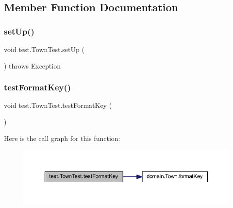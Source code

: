 \subsection{Member Function Documentation}
\mbox{\label{classtest_1_1_town_test_a9818b619a3ef6d7d7c03f19d48456eaf}} 
\subsubsection{\texorpdfstring{set\+Up()}{setUp()}}
{\footnotesize\ttfamily void test.\+Town\+Test.\+set\+Up (\begin{DoxyParamCaption}{ }\end{DoxyParamCaption}) throws Exception}

\mbox{\label{classtest_1_1_town_test_aafaac696506ffac04363befb43bf7b23}} 
\subsubsection{\texorpdfstring{test\+Format\+Key()}{testFormatKey()}}
{\footnotesize\ttfamily void test.\+Town\+Test.\+test\+Format\+Key (\begin{DoxyParamCaption}{ }\end{DoxyParamCaption})}

Here is the call graph for this function\+:\nopagebreak
\begin{figure}[H]
\begin{center}
\leavevmode
\includegraphics[width=350pt]{classtest_1_1_town_test_aafaac696506ffac04363befb43bf7b23_cgraph}
\end{center}
\end{figure}
\mbox{\label{classtest_1_1_town_test_afb0700534b21a2cab187cf97aee0915b}} 
